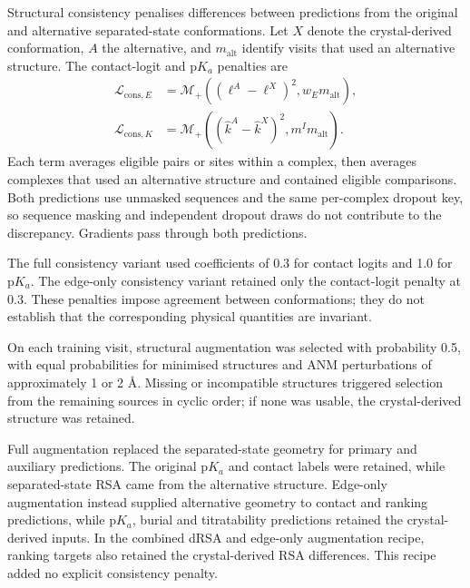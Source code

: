 Structural consistency penalises differences between predictions from the original and alternative separated-state conformations. Let $X$ denote the crystal-derived conformation, $A$ the alternative, and $m_{\mathrm{alt}}$ identify visits that used an alternative structure. The contact-logit and $\mathrm{p}K_a$ penalties are
\begin{equation}
    \begin{aligned}
        \mathcal L_{\mathrm{cons},E}
        &=\mathcal M_+\!\left(
        (\ell^A-\ell^X)^2,w_E m_{\mathrm{alt}}
        \right),\\
        \mathcal L_{\mathrm{cons},K}
        &=\mathcal M_+\!\left(
        (\hat{k}^A-\hat{k}^X)^2,m^I m_{\mathrm{alt}}
        \right).
    \end{aligned}
    \label{eq:jaxka-consistency-losses}
\end{equation}
Each term averages eligible pairs or sites within a complex, then averages complexes that used an alternative structure and contained eligible comparisons. Both predictions use unmasked sequences and the same per-complex dropout key, so sequence masking and independent dropout draws do not contribute to the discrepancy. Gradients pass through both predictions.

The full consistency variant used coefficients of 0.3 for contact logits and 1.0 for $\mathrm{p}K_a$. The edge-only consistency variant retained only the contact-logit penalty at 0.3. These penalties impose agreement between conformations; they do not establish that the corresponding physical quantities are invariant.

On each training visit, structural augmentation was selected with probability 0.5, with equal probabilities for minimised structures and ANM perturbations of approximately 1 or 2 \AA{}. Missing or incompatible structures triggered selection from the remaining sources in cyclic order; if none was usable, the crystal-derived structure was retained.

Full augmentation replaced the separated-state geometry for primary and auxiliary predictions. The original $\mathrm{p}K_a$ and contact labels were retained, while separated-state RSA came from the alternative structure. Edge-only augmentation instead supplied alternative geometry to contact and ranking predictions, while $\mathrm{p}K_a$, burial and titratability predictions retained the crystal-derived inputs. In the combined dRSA and edge-only augmentation recipe, ranking targets also retained the crystal-derived RSA differences. This recipe added no explicit consistency penalty.

